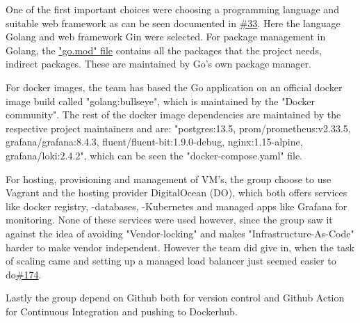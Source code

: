 
One of the first important choices were choosing a programming language and suitable web framework as can be seen documented in \href{https://github.com/DevelOpsITU/MiniTwit/issues/33}{\#33}. Here the language Golang and web framework Gin were selected. For package management in Golang, the \href{https://github.com/DevelOpsITU/MiniTwit/blob/main/go.mod}{"go.mod" file} contains all the packages that the project needs, indirect packages. These are maintained by Go's own package manager.

For docker images, the team has based the Go application on an official docker image build called "golang:bullseye", which is maintained by the "Docker community"\cite{docker_go_image}. The rest of the docker image dependencies are maintained by the respective project maintainers and are: "postgres:13.5, prom/prometheus:v2.33.5, grafana/grafana:8.4.3, fluent/fluent-bit:1.9.0-debug, nginx:1.15-alpine, grafana/loki:2.4.2", which can be seen the "docker-compose.yaml"\cite{github_minitwit_dockercompose} file.

For hosting, provisioning and management of VM's, the group choose to use Vagrant and the hosting provider DigitalOcean (DO), which both offers services like docker registry, -databases, -Kubernetes and managed apps like Grafana for monitoring. None of these services were used however, since the group saw it against the idea of avoiding "Vendor-locking" and makes "Infrastructure-As-Code" harder to make vendor independent. However the team did give in, when the task of scaling came and setting up a managed load balancer just seemed easier to do\href{https://github.com/DevelOpsITU/MiniTwit/issues/174}{\#174}. 

Lastly the group depend on Github both for version control and Github Action for Continuous Integration and pushing to Dockerhub.


